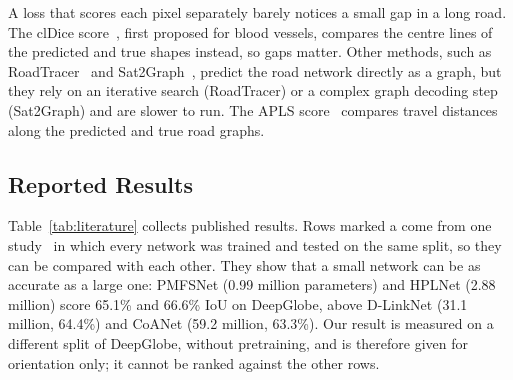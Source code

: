 \documentclass{ieeeaccess}
\begin{document}
A loss that scores each pixel separately barely notices a small gap in a long road. The clDice score~\cite{shit2021cldice}, first proposed for blood vessels, compares the centre lines of the predicted and true shapes instead, so gaps matter. Other methods, such as RoadTracer~\cite{bastani2018roadtracer} and Sat2Graph~\cite{he2020sat2graph}, predict the road network directly as a graph, but they rely on an iterative search (RoadTracer) or a complex graph decoding step (Sat2Graph) and are slower to run. The APLS score~\cite{vanetten2018spacenet} compares travel distances along the predicted and true road graphs.

\subsection{Reported Results}

Table~\ref{tab:literature} collects published results. Rows marked a come from one study~\cite{cui2025hplnet} in which every network was trained and tested on the same split, so they can be compared with each other. They show that a small network can be as accurate as a large one: PMFSNet (0.99 million parameters) and HPLNet (2.88 million) score 65.1\% and 66.6\% IoU on DeepGlobe, above D-LinkNet (31.1 million, 64.4\%) and CoANet (59.2 million, 63.3\%). Our result is measured on a different split of DeepGlobe, without pretraining, and is therefore given for orientation only; it cannot be ranked against the other rows.
\end{document}
